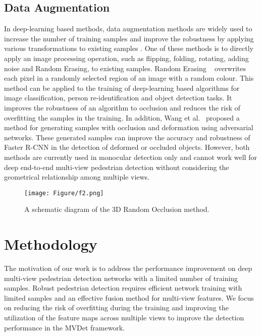 \documentclass[runningheads]{llncs}
\begin{document}
	\subsection{Data Augmentation}
	In deep-learning based methods, data augmentation methods are widely used to increase the number of training samples and improve the robustness by applying various transformations to existing samples \cite{he2016deep}\cite{simonyan2014very}\cite{krizhevsky2012imagenet}. One of these methods is to directly apply an image processing operation, such as flipping, folding, rotating, adding noise and Random Erasing, to existing samples. Random Erasing ~\cite{zhong2020random} overwrites each pixel in a randomly selected region of an image with a random colour. This method can be applied to the training of deep-learning based algorithms for image classification, person re-identification and object detection tasks. It improves the robustness of an algorithm to occlusion and reduces the risk of overfitting the samples in the training. In addition, Wang et al.~\cite{wang2017fast} proposed a method for generating samples with occlusion and deformation using adversarial networks. These generated samples can improve the accuracy and robustness of Faster R-CNN in the detection of deformed or occluded objects. However, both methods are currently used in monocular detection only and cannot work well for deep end-to-end multi-view pedestrian detection without considering the geometrical relationship among multiple views.


	


	\begin{figure}[t]
		\centering
		\texttt{[image: Figure/f2.png]}
\caption{A schematic diagram of the 3D Random Occlusion method.}
		\label{f2}
	\end{figure}
	
	
	\section{Methodology}
	
	The motivation of our work is to address the performance improvement on deep multi-view pedestrian detection networks with a limited number of training samples.
Robust pedestrian detection requires efficient network training with limited samples and an effective fusion method for multi-view features. We focus on reducing the risk of overfitting during the training and improving the utilization of the feature maps across multiple views to improve the detection performance in the MVDet framework.
\end{document}
